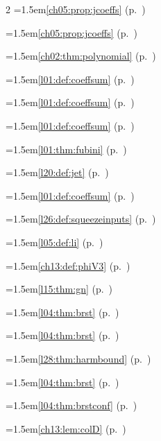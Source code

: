 \begin{multicols}{2}
\hangindent=1.5em\quad \ref{ch05:prop:jcoeffs} (p.~\pageref{ch05:prop:jcoeffs})\par
\hangindent=1.5em\quad \ref{ch05:prop:jcoeffs} (p.~\pageref{ch05:prop:jcoeffs})\par
\hangindent=1.5em\quad \ref{ch02:thm:polynomial} (p.~\pageref{ch02:thm:polynomial})\par
\hangindent=1.5em\quad \ref{l01:def:coeffsum} (p.~\pageref{l01:def:coeffsum})\par
\hangindent=1.5em\quad \ref{l01:def:coeffsum} (p.~\pageref{l01:def:coeffsum})\par
\hangindent=1.5em\quad \ref{l01:def:coeffsum} (p.~\pageref{l01:def:coeffsum})\par
\hangindent=1.5em\quad \ref{l01:thm:fubini} (p.~\pageref{l01:thm:fubini})\par
\hangindent=1.5em\quad \ref{l20:def:jet} (p.~\pageref{l20:def:jet})\par
\hangindent=1.5em\quad \ref{l01:def:coeffsum} (p.~\pageref{l01:def:coeffsum})\par
\hangindent=1.5em\quad \ref{l26:def:squeezeinputs} (p.~\pageref{l26:def:squeezeinputs})\par
\hangindent=1.5em\quad \ref{l05:def:li} (p.~\pageref{l05:def:li})\par
\hangindent=1.5em\quad \ref{ch13:def:phiV3} (p.~\pageref{ch13:def:phiV3})\par
\hangindent=1.5em\quad \ref{l15:thm:gn} (p.~\pageref{l15:thm:gn})\par
\hangindent=1.5em\quad \ref{l04:thm:brst} (p.~\pageref{l04:thm:brst})\par
\hangindent=1.5em\quad \ref{l04:thm:brst} (p.~\pageref{l04:thm:brst})\par
\hangindent=1.5em\quad \ref{l28:thm:harmbound} (p.~\pageref{l28:thm:harmbound})\par
\hangindent=1.5em\quad \ref{l04:thm:brst} (p.~\pageref{l04:thm:brst})\par
\hangindent=1.5em\quad \ref{l04:thm:brstconf} (p.~\pageref{l04:thm:brstconf})\par
\hangindent=1.5em\quad \ref{ch13:lem:colD} (p.~\pageref{ch13:lem:colD})\par

\end{multicols}
